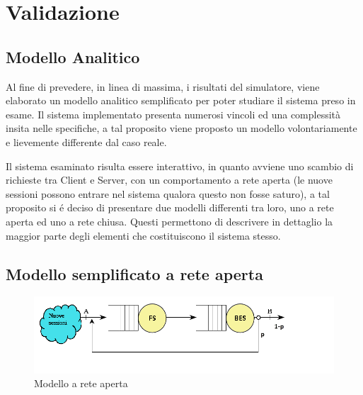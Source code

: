 \chapter{Validazione} 

\section{Modello Analitico}
Al fine di prevedere, in linea di massima, i risultati del simulatore, viene 
elaborato un modello  analitico semplificato per poter studiare il sistema preso 
in esame.
Il sistema implementato presenta numerosi vincoli ed una complessit\`a insita 
nelle specifiche, a tal proposito viene proposto un modello volontariamente e 
lievemente differente dal caso reale.

Il sistema esaminato risulta essere interattivo, in quanto avviene uno scambio 
di richieste tra Client e Server, con un comportamento a rete aperta (le nuove 
sessioni possono entrare nel sistema qualora questo non fosse saturo), a tal 
proposito si \'e deciso di presentare due modelli differenti tra loro, uno a 
rete aperta ed uno a rete chiusa. Questi permettono di descrivere in dettaglio 
la maggior parte degli elementi che costituiscono il sistema stesso.

\section{Modello semplificato a rete aperta}
\begin{figure}[H]
  \centering
  \includegraphics[scale=0.7]{img/reteJackson.png}
  \caption[Modello a rete aperta]{Modello a rete aperta}
  \label{fig:Modello a rete aperta}
\end{figure}

